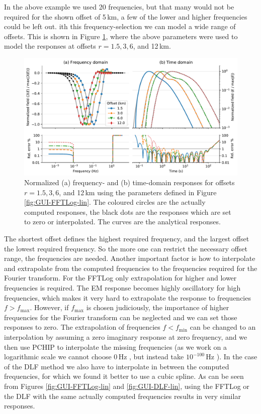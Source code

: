\documentclass[extra, camera,%
    referee,     %
]{gji}
\newlength{\fwidth}
\begin{document}
%
In the above example we used 20 frequencies, but that many would not be
required for the shown offset of 5\,km, a few of the lower and higher
frequencies could be left out.  ith this frequency-selection
we can model a wide range of offsets. This is shown in Figure
\ref{fig:multi-offset}, where the above parameters were used to model the
responses at offsets $r=1.5,3,6$, and 12\,km.
%
\begin{figure}
  \centering
  \includegraphics[width=0.75\fwidth]{03-multi-offset}
  \caption{Normalized (a) frequency- and (b) time-domain responses for offsets
    $r=1.5,3,6$, and 12\,km using the parameters defined in Figure
    \ref{fig:GUI-FFTLog-lin}. The coloured circles are the actually computed
    responses, the black dots are the responses which are set to zero or
    interpolated. The  curves are the analytical
    responses.}
  \label{fig:multi-offset}
\end{figure}
%

The shortest offset defines the highest required frequency, and the largest
offset the lowest required frequency. So the more one can restrict the
necessary offset range, the  frequencies are needed.
Another important factor is how to interpolate and extrapolate from the
computed frequencies to the frequencies required for the Fourier transform. For
the FFTLog only extrapolation for higher and lower frequencies is required. The
EM response becomes highly oscillatory for high frequencies, which makes it
very hard to extrapolate the response to frequencies $f>f_\mathrm{max}$.
However, if $f_\mathrm{max}$ is chosen judiciously, the importance of higher
frequencies for the Fourier transform can be neglected and we can set those
responses to zero. The extrapolation of frequencies $f<f_\mathrm{min}$ can be
changed to an interpolation by assuming a zero imaginary response at zero
frequency, and we then use PCHIP to interpolate the missing frequencies (as we
work on a logarithmic scale we cannot choose 0\,Hz , but
instead take $10^{-100}$\,Hz ). In the case of the
DLF method we also have to interpolate in between the computed frequencies, for
which we found it better to use a cubic spline. As can be seen from Figures
\ref{fig:GUI-FFTLog-lin} and \ref{fig:GUI-DLF-lin}, using the FFTLog or the DLF
with the same actually computed frequencies results in very similar responses.
\end{document}
